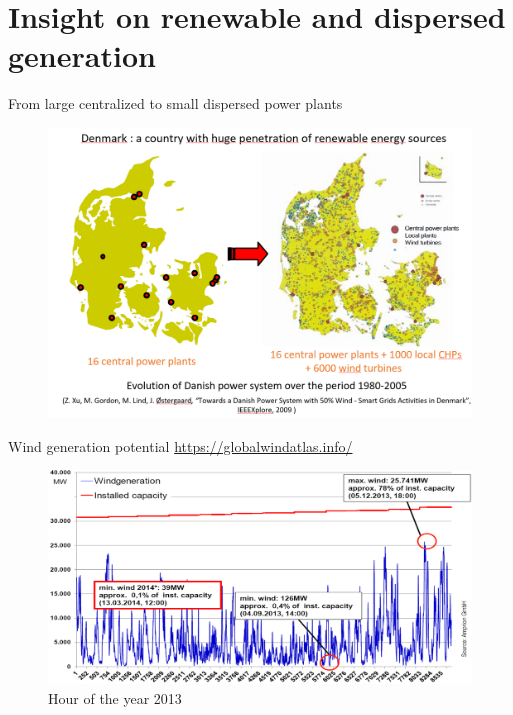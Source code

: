 \section{Insight on renewable and dispersed generation}

\begin{frame}
{From large centralized to small dispersed power plants}
\begin{figure}
\centering
\includegraphics[width=\linewidth]{images/danemark_RES.png}
\end{figure}
\end{frame}

\begin{frame}
{Wind generation potential}
\url{https://globalwindatlas.info/}
\begin{figure}
\centering
\includegraphics[width=\linewidth]{images/wind_gen_DE.png}
\caption*{Hour of the year 2013}
\end{figure}
\end{frame}

